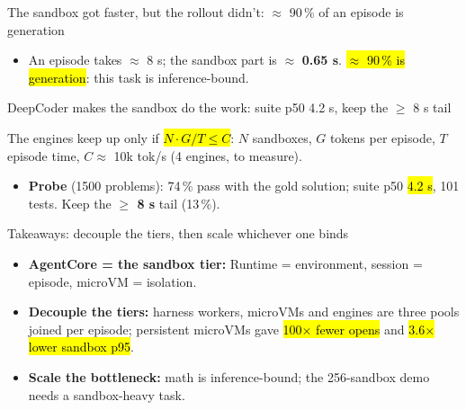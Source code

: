\begin{frame}{The sandbox got faster, but the rollout didn't: $\approx$ 90\,\% of an episode is generation}
\centering
{}\par
\vspace{2mm}
\raggedright
\begin{itemize}\small
\item An episode takes $\approx$ 8 s; the sandbox part is $\approx$ \textbf{0.65 s}. \hl{$\approx$ 90\,\% is generation}: this task is inference-bound.
\end{itemize}
\end{frame}


\begin{frame}{DeepCoder makes the sandbox do the work: suite p50 4.2 s, keep the $\ge$ 8 s tail}
{\small The engines keep up only if \hl{$N \cdot G / T \le C$}: $N$ sandboxes, $G$ tokens per episode, $T$ episode time, $C \approx$ 10k tok/s (4 engines, to measure).\par}
\vspace{2mm}
\centering
{}\par
\vspace{2mm}
\raggedright
\begin{itemize}\small
\item \textbf{Probe} (1500 problems): 74\,\% pass with the gold solution; suite p50 \hl{4.2 s}, 101 tests. Keep the \textbf{$\ge$ 8 s} tail (13\,\%).
\end{itemize}
\end{frame}

\begin{frame}{Takeaways: decouple the tiers, then scale whichever one binds}
\vspace{4mm}
\begin{itemize}\normalsize\setlength{\itemsep}{5mm}
\item \textbf{AgentCore = the sandbox tier:} Runtime = environment, session = episode, microVM = isolation.
\item \textbf{Decouple the tiers:} harness workers, microVMs and engines are three pools joined per episode; persistent microVMs gave \hl{100$\times$ fewer opens} and \hl{3.6$\times$ lower sandbox p95}.
\item \textbf{Scale the bottleneck:} math is inference-bound; the 256-sandbox demo needs a sandbox-heavy task.
\end{itemize}
\end{frame}

